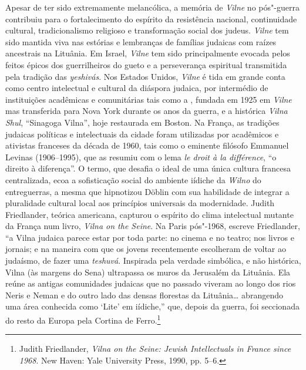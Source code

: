 Apesar de ter sido extremamente melancólica, a memória de \textit{Vilne} no
pós"-guerra contribuiu para o fortalecimento do espírito da resistência
nacional, continuidade cultural, tradicionalismo religioso e
transformação social dos judeus. \textit{Vilne} tem sido mantida viva nas
estórias e lembranças de famílias judaicas com raízes ancestrais na
Lituânia. Em Israel, \textit{Vilne} tem sido principalmente evocada pelos feitos
épicos dos guerrilheiros do gueto e a perseverança espiritual
transmitida pela tradição das \textit{yeshivás}. Nos Estados Unidos, \textit{Vilne} é tida
em grande conta como centro intelectual e cultural da diáspora judaica,
por intermédio de instituições acadêmicas e comunitárias tais como a
, fundada em 1925 em \textit{Vilne} mas transferida para Nova York durante os
anos da guerra, e a histórica \textit{Vilna Shul}, ``Sinagoga Vilna'', hoje restaurada em Boston. 
Na França, as tradições judaicas políticas e
intelectuais da cidade foram utilizadas por acadêmicos e ativistas
franceses da década de 1960, tais como o eminente filósofo Emmanuel
Levinas (1906--1995), que as resumiu com o lema \textit{le droit à la
différence}, ``o direito à diferença''. O termo, que desafia o ideal de
uma única cultura francesa centralizada, ecoa a sofisticação social do
ambiente iídiche da \textit{Wilno} do entreguerras, a mesma que hipnotizou
Döblin com sua habilidade de integrar a pluralidade cultural local aos
princípios universais da modernidade. Judith Friedlander, teórica
americana, capturou o espírito do clima intelectual mutante da França
num livro, \textit{Vilna on the Seine}. Na Paris pós"-1968, escreve
Friedlander, ``a Vilna judaica parece estar por toda parte: no cinema e
no teatro; nos livros e jornais; e na maneira com que os jovens
recentemente escolheram de voltar ao judaísmo, de fazer uma \textit{teshuvá}.
Inspirada pela verdade simbólica, e não histórica, Vilna (às margens do
Sena) ultrapassa os muros da Jerusalém da Lituânia. Ela reúne as antigas
comunidades judaicas que no passado viveram ao longo dos rios Neris e
Neman e do outro lado das densas florestas da Lituânia\ldots{}
abrangendo uma área conhecida como `Lite' em iídiche,'' que, depois da
guerra, foi seccionada do resto da Europa pela Cortina de
Ferro.\footnote{Judith Friedlander, \textit{Vilna on the Seine: Jewish Intellectuals in France since 1968}. New Haven: Yale University Press, 1990, pp. 5--6.}

